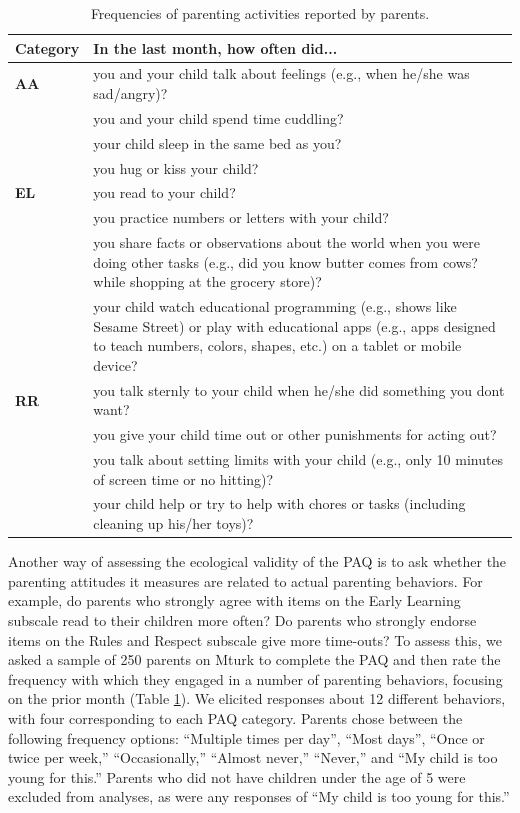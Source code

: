 \documentclass[floatsintext,man]{apa6}
\theoremstyle{definition}
\theoremstyle{definition}
\theoremstyle{definition}
\theoremstyle{remark}
\begin{document}
\begin{table}[!h]

\caption{\label{tab:behavesents}Frequencies of parenting activities reported by parents.}
\centering
\fontsize{9}{11}\selectfont
\begin{tabular}[t]{>{\bfseries}l>{\raggedright\arraybackslash}p{40em}}
\toprule
Category & In the last month, how often did...\\
\midrule
AA & you and your child talk about feelings (e.g., when he/she was sad/angry)?\\
 & you and your child spend time cuddling?\\
 & your child sleep in the same bed as you?\\
 & you hug or kiss your child?\\
EL & you read to your child?\\
\addlinespace
 & you practice numbers or letters with your child?\\
 & you share facts or observations about the world when you were doing other tasks (e.g., did you know butter comes from cows? while shopping at the grocery store)?\\
 & your child watch educational programming (e.g., shows like Sesame Street) or play with educational apps (e.g., apps designed to teach numbers, colors, shapes, etc.) on a tablet or mobile device?\\
RR & you talk sternly to your child when he/she did something you dont want?\\
 & you give your child time out or other punishments for acting out?\\
\addlinespace
 & you talk about setting limits with your child (e.g., only 10 minutes of screen time or no hitting)?\\
 & your child help or try to help with chores or tasks (including cleaning up his/her toys)?\\
\bottomrule
\end{tabular}
\end{table}

Another way of assessing the ecological validity of the PAQ is to ask
whether the parenting attitudes it measures are related to actual
parenting behaviors. For example, do parents who strongly agree with
items on the Early Learning subscale read to their children more often?
Do parents who strongly endorse items on the Rules and Respect subscale
give more time-outs? To assess this, we asked a sample of 250 parents on
Mturk to complete the PAQ and then rate the frequency with which they
engaged in a number of parenting behaviors, focusing on the prior month
(Table \ref{tab:behavesents}). We elicited responses about 12 different
behaviors, with four corresponding to each PAQ category. Parents chose
between the following frequency options: \enquote{Multiple times per
day}, \enquote{Most days}, \enquote{Once or twice per week,}
\enquote{Occasionally,} \enquote{Almost never,} \enquote{Never,} and
\enquote{My child is too young for this.} Parents who did not have
children under the age of 5 were excluded from analyses, as were any
responses of \enquote{My child is too young for this.}
\end{document}
